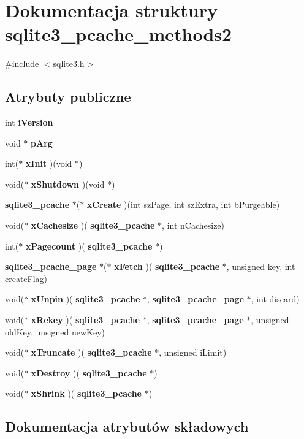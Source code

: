 \section{Dokumentacja struktury sqlite3\+\_\+pcache\+\_\+methods2}
\label{structsqlite3__pcache__methods2}


{\ttfamily \#include $<$sqlite3.\+h$>$}

\subsection*{Atrybuty publiczne}
\begin{DoxyCompactItemize}
\item 
int \textbf{ i\+Version}
\item 
void $\ast$ \textbf{ p\+Arg}
\item 
int($\ast$ \textbf{ x\+Init} )(void $\ast$)
\item 
void($\ast$ \textbf{ x\+Shutdown} )(void $\ast$)
\item 
\textbf{ sqlite3\+\_\+pcache} $\ast$($\ast$ \textbf{ x\+Create} )(int sz\+Page, int sz\+Extra, int b\+Purgeable)
\item 
void($\ast$ \textbf{ x\+Cachesize} )(\textbf{ sqlite3\+\_\+pcache} $\ast$, int n\+Cachesize)
\item 
int($\ast$ \textbf{ x\+Pagecount} )(\textbf{ sqlite3\+\_\+pcache} $\ast$)
\item 
\textbf{ sqlite3\+\_\+pcache\+\_\+page} $\ast$($\ast$ \textbf{ x\+Fetch} )(\textbf{ sqlite3\+\_\+pcache} $\ast$, unsigned key, int create\+Flag)
\item 
void($\ast$ \textbf{ x\+Unpin} )(\textbf{ sqlite3\+\_\+pcache} $\ast$, \textbf{ sqlite3\+\_\+pcache\+\_\+page} $\ast$, int discard)
\item 
void($\ast$ \textbf{ x\+Rekey} )(\textbf{ sqlite3\+\_\+pcache} $\ast$, \textbf{ sqlite3\+\_\+pcache\+\_\+page} $\ast$, unsigned old\+Key, unsigned new\+Key)
\item 
void($\ast$ \textbf{ x\+Truncate} )(\textbf{ sqlite3\+\_\+pcache} $\ast$, unsigned i\+Limit)
\item 
void($\ast$ \textbf{ x\+Destroy} )(\textbf{ sqlite3\+\_\+pcache} $\ast$)
\item 
void($\ast$ \textbf{ x\+Shrink} )(\textbf{ sqlite3\+\_\+pcache} $\ast$)
\end{DoxyCompactItemize}


\subsection{Dokumentacja atrybutów składowych}
\mbox{\label{structsqlite3__pcache__methods2_a03b27be6c7cb8f1d2662c454cbe58483}} 
